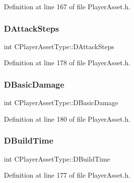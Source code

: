 Definition at line 167 of file Player\+Asset.\+h.

\hypertarget{classCPlayerAssetType_af2a95fbee4ed2ac1ff1da0f649966a6d}{}\label{classCPlayerAssetType_af2a95fbee4ed2ac1ff1da0f649966a6d} 
\subsubsection{\texorpdfstring{D\+Attack\+Steps}{DAttackSteps}}
{\footnotesize\ttfamily int C\+Player\+Asset\+Type\+::\+D\+Attack\+Steps\hspace{0.3cm}{\ttfamily [protected]}}



Definition at line 178 of file Player\+Asset.\+h.

\hypertarget{classCPlayerAssetType_ade46bb31e24e01ba4b523bdf67472d59}{}\label{classCPlayerAssetType_ade46bb31e24e01ba4b523bdf67472d59} 
\subsubsection{\texorpdfstring{D\+Basic\+Damage}{DBasicDamage}}
{\footnotesize\ttfamily int C\+Player\+Asset\+Type\+::\+D\+Basic\+Damage\hspace{0.3cm}{\ttfamily [protected]}}



Definition at line 180 of file Player\+Asset.\+h.

\hypertarget{classCPlayerAssetType_aa65de0691276352ebc3c3a9936a74278}{}\label{classCPlayerAssetType_aa65de0691276352ebc3c3a9936a74278} 
\subsubsection{\texorpdfstring{D\+Build\+Time}{DBuildTime}}
{\footnotesize\ttfamily int C\+Player\+Asset\+Type\+::\+D\+Build\+Time\hspace{0.3cm}{\ttfamily [protected]}}



Definition at line 177 of file Player\+Asset.\+h.


